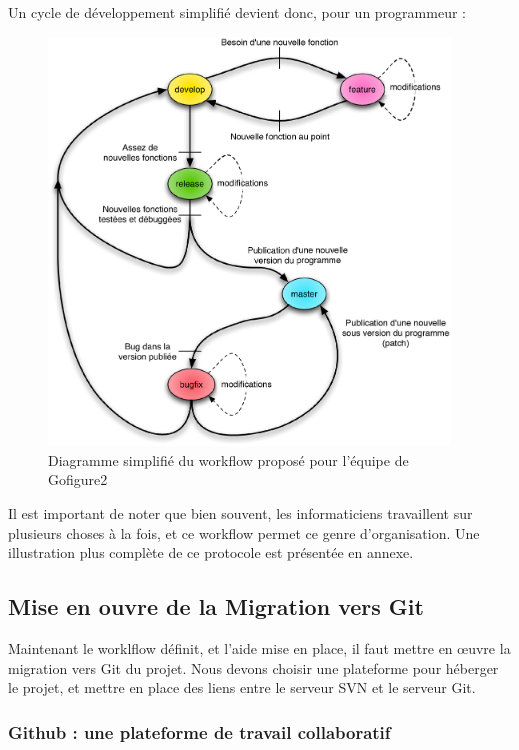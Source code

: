 Un cycle de développement simplifié devient donc, pour un programmeur :
\begin{figure}[H]
\begin{center}
\leavevmode
\includegraphics[width=0.95\textwidth]{pictures/Git_WorkflowSimple}
\end{center}
\caption{Diagramme simplifié du workflow proposé pour l'équipe de Gofigure2}
\label{fig:Workflow Git de Gofigure2}
\end{figure}

Il est important de noter que bien souvent, les informaticiens travaillent sur plusieurs choses à la fois, et ce workflow permet ce genre d'organisation. 
Une illustration plus complète de ce protocole est présentée en annexe.


\subsection{Mise en ouvre de la Migration vers Git}

Maintenant le worklflow définit, et l'aide mise en place, il faut mettre en œuvre la migration vers Git du projet. Nous devons choisir une plateforme pour héberger le projet, et mettre en place des liens entre le serveur SVN et le serveur Git.

\subsubsection{Github : une plateforme de travail collaboratif}

